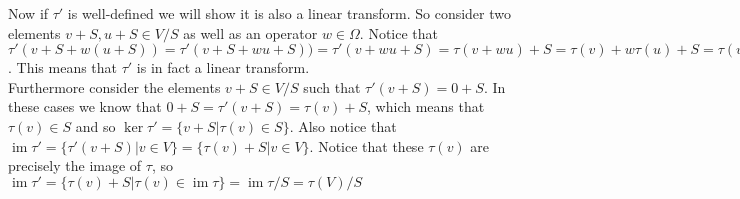 \documentclass[12pt]{amsart}
\theoremstyle{definition}
\DeclareMathOperator{\kernel}{\mathrm{ker}}
\DeclareMathOperator{\image}{\mathrm{im}}
\begin{document}
\begin{itemize}
Now if $\tau'$ is well-defined we will show it is also a linear transform. So consider two elements $v+S,u+S\in V/S$ as well as an operator $w\in\Omega$. Notice that $\tau'(v+S+w(u+S))=\tau'(v+S+wu+S))=\tau'(v+wu+S)=\tau(v+wu)+S=\tau(v)+w\tau(u)+S=\tau(v)+S+w\tau(u)+S=\tau'(v+S)+w\tau'(u+S)$. This means that $\tau'$ is in fact a linear transform.\\

Furthermore consider the elements $v+S\in V/S$ such that $\tau'(v+S)=0+S$. In these cases we know that $0+S=\tau'(v+S)=\tau(v)+S$, which means that $\tau(v)\in S$ and so $\kernel\tau'=\{v+S|\tau(v)\in S\}$. %
Also notice that $\image\tau'=\{\tau'(v+S)|v\in V\}=\{\tau(v)+S|v\in V\}$. Notice that these $\tau(v)$ are precisely the image of $\tau$, so $\image\tau'=\{\tau(v)+S|\tau(v)\in \image\tau\}=\image\tau/S=\tau(V)/S$
\end{itemize}
\end{document}
